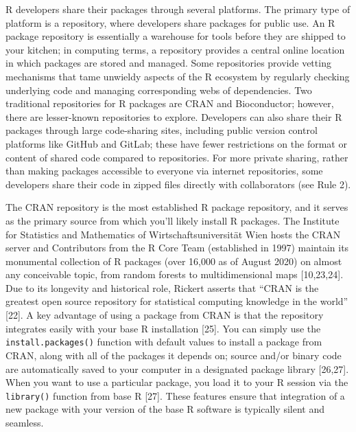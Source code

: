 \documentclass[10pt,letterpaper]{article}
\begin{document}
R developers share their packages through several platforms. The primary
type of platform is a repository, where developers share packages for
public use. An R package repository is essentially a warehouse for tools
before they are shipped to your kitchen; in computing terms, a
repository provides a central online location in which packages are
stored and managed. Some repositories provide vetting mechanisms that
tame unwieldy aspects of the R ecosystem by regularly checking
underlying code and managing corresponding webs of dependencies. Two
traditional repositories for R packages are CRAN and Bioconductor;
however, there are lesser-known repositories to explore. Developers can
also share their R packages through large code-sharing sites, including
public version control platforms like GitHub and GitLab; these have
fewer restrictions on the format or content of shared code compared to
repositories. For more private sharing, rather than making packages
accessible to everyone via internet repositories, some developers share
their code in zipped files directly with collaborators (see Rule 2).

The CRAN repository is the most established R package repository, and it
serves as the primary source from which you'll likely install R
packages. The Institute for Statistics and Mathematics of
Wirtschaftsuniversität Wien hosts the CRAN server and Contributors from
the R Core Team (established in 1997) maintain its monumental collection
of R packages (over 16,000 as of August 2020) on almost any conceivable
topic, from random forests to multidimensional maps {[}10,23,24{]}. Due
to its longevity and historical role, Rickert asserts that ``CRAN is the
greatest open source repository for statistical computing knowledge in
the world'' {[}22{]}. A key advantage of using a package from CRAN is
that the repository integrates easily with your base R installation
{[}25{]}. You can simply use the \texttt{install.packages()} function
with default values to install a package from CRAN, along with all of
the packages it depends on; source and/or binary code are automatically
saved to your computer in a designated package library {[}26,27{]}. When
you want to use a particular package, you load it to your R session via
the \texttt{library()} function from base R {[}27{]}. These features
ensure that integration of a new package with your version of the base R
software is typically silent and seamless.
\end{document}

